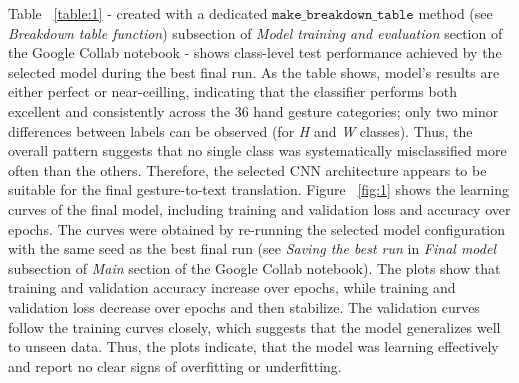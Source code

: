 \documentclass{article}
\newcommand{\code}[1]{\texttt{#1}} %
\begin{document}
Table ~\ref{table:1} - created with a dedicated $\code{make\_breakdown\_table}$ method (see \textit{Breakdown table function}) 
subsection of \textit{Model training and evaluation} section of the Google Collab notebook - shows class-level test performance achieved by 
the selected model during the best final run. As the table shows, model's results are either perfect or near-ceilling, indicating that the 
classifier performs both excellent and consistently across the 36 hand gesture categories; only two minor differences between labels can be observed 
(for \textit{H} and \textit{W} classes). Thus, the overall pattern suggests that no single class was systematically misclassified more often 
than the others. Therefore, the selected CNN architecture appears to be suitable for the final gesture-to-text translation.
Figure ~\ref{fig:1} shows the learning curves of the final model, including training and validation loss and accuracy over epochs. 
The curves were obtained by re-running the selected model configuration with the same seed as the best final run (see \textit{Saving the best run} 
in \textit{Final model} subsection of \textit{Main} section of the Google Collab notebook). The plots show that training and validation accuracy
increase over epochs, while training and validation loss decrease over epochs and then stabilize. The validation curves follow the training curves
closely, which suggests that the model generalizes well to unseen data. Thus, the plots indicate, that the model was learning effectively and report 
no clear signs of overfitting or underfitting. 
\end{document}
